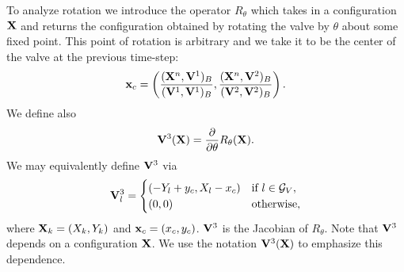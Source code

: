 To analyze rotation we introduce the operator $R_{\theta}$ which takes in a configuration $\mathbf{X}$ and returns the configuration obtained by rotating the valve by $\theta$ about some fixed point. This point of rotation is arbitrary and we take it to be the center of the valve at the previous time-step:
\begin{equation}
\mathbf{x}_c = 
\left(\frac{( \mathbf{X}^n, \mathbf{V}^1)_B}{( \mathbf{V}^1, \mathbf{V}^1)_B}, 
\frac{( \mathbf{X}^n, \mathbf{V}^2)_B}{( \mathbf{V}^2, \mathbf{V}^2)_B}\right).
\label{eqn:Center}
\end{equation}
We define also
\begin{equation}
\mathbf{V}^3(\mathbf{X}) = \frac{\partial}{\partial \theta}R_\theta(\mathbf{X}). 
\label{eqn:e3}
\end{equation}
We may equivalently define $\mathbf{V}^3$ via
\begin{equation}
\mathbf{V}^3_l =
\begin{cases}
(-Y_l+y_c,X_l-x_c)& \textrm{if } l\in \mathcal{G}_V, \\
(0,0)& \textrm{otherwise},
\end{cases}
\end{equation}
where $\mathbf{X}_k=(X_k,Y_k)$ and $\mathbf{x}_c = (x_c,y_c)$. $\mathbf{V}^3$ is the Jacobian of $R_\theta$. Note that $\mathbf{V}^3$ depends on a configuration $\mathbf{X}$. We use the
notation $\mathbf{V}^3(\mathbf{X})$ to emphasize this dependence.

